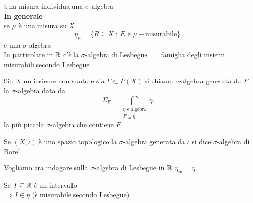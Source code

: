 \documentclass[12px]{article}
\begin{document}
Una misura individua una $\sigma$-algebra\\
\textbf{In generale}\\
se $\mu$ è una misura su  $X$\\
 \[
	 \eta_\mu = \{R\subseteq X \ : \ E \text{ e } \mu-\text{misurabile}\}
.\] 
è una $\sigma$-algebra\\
In particolare in $\mathbb{R}$ c'è la $\sigma$-algebra di Lesbegue $=$ famiglia degli insiemi misurabili secondo Lesbegue\\
\begin{defi}
	Sia $X$ un insieme non vuoto e sia $F\subset P(X)$ si chiama  $\sigma$-algebra generata da $F$ la $\sigma$-algebra data da 
	\[
		\Sigma_F = \bigcap_{\substack{\eta\text{ è algebra}\\ F\subseteq \eta}}\eta
	.\] 
	la più piccola $\sigma$-algebra che contiene $F$
\end{defi}
\begin{defi}
	Se $(X,\iota)$ è uno spazio topologico la  $\sigma$-algebra generata da $\iota$ si dice $\sigma$-algebra di Borel
\end{defi}
Vogliamo ora indagare sulla $\sigma$-algebra di Lesbegue in $\mathbb{R}$ $\eta_m = \eta$
 \begin{prop}
	Se  $I\subseteq \mathbb{R}$ è un intervallo\\
	 $ \Rightarrow  I \in\eta $ (è misurabile secondo Lesbegue)
\end{prop}
\end{document}
